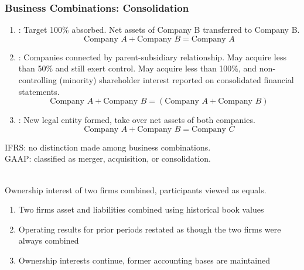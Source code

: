 \subsubsection{Business Combinations: Consolidation}

\begin{definition} 
\begin{enumerate}[label=\roman*.]
\setlength{\itemsep}{0pt}
\item {}: Target 100\% absorbed. Net assets of Company B transferred to Company B.
\begin{equation}
\text{Company } A + \text{Company } B = \text{Company } A \nonumber
\end{equation}
\item {}: Companies connected by parent-subsidiary relationship. May acquire less than 50\% and still exert control. May acquire less than 100\%, and non-controlling (minority) shareholder interest reported on consolidated financial statements.
\begin{equation}
\text{Company } A + \text{Company } B = (\text{Company } A + \text{Company } B) \nonumber
\end{equation}
\item {}: New legal entity formed, take over net assets of both companies. 
\begin{equation}
\text{Company } A + \text{Company } B = \text{Company } C \nonumber
\end{equation}
\end{enumerate}
IFRS: no distinction made among business combinations.\\
GAAP: classified as merger, acquisition, or consolidation.
\end{definition}

\begin{method} \\
Ownership interest of two firms combined, participants viewed as equals.
\begin{enumerate}[label=\roman*.]
\setlength{\itemsep}{0pt}
\item Two firms asset and liabilities combined using historical book values
\item Operating results for prior periods restated as though the two firms were always combined
\item Ownership interests continue, former accounting bases are maintained
\end{enumerate}
\end{method}

